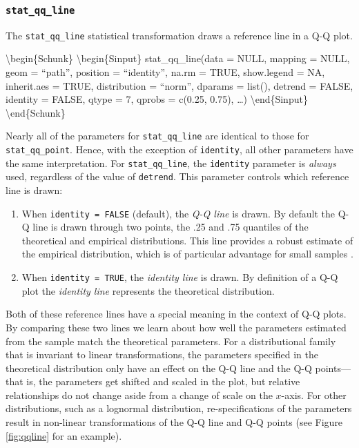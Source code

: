 \hypertarget{stat_qq_line}{%
\subsubsection{\texorpdfstring{\texttt{stat\_qq\_line}}{stat\_qq\_line}}\label{stat_qq_line}}

The \texttt{stat\_qq\_line} statistical transformation draws a reference
line in a Q-Q plot.

\textbackslash{}begin\{Schunk\} \textbackslash{}begin\{Sinput\}
stat\_qq\_line(data = NULL, mapping = NULL, geom = ``path'', position =
``identity'', na.rm = TRUE, show.legend = NA, inherit.aes = TRUE,
distribution = ``norm'', dparams = list(), detrend = FALSE, identity =
FALSE, qtype = 7, qprobs = c(0.25, 0.75), \ldots{})
\textbackslash{}end\{Sinput\} \textbackslash{}end\{Schunk\}

Nearly all of the parameters for \texttt{stat\_qq\_line} are identical
to those for \texttt{stat\_qq\_point}. Hence, with the exception of
\texttt{identity}, all other parameters have the same interpretation.
For \texttt{stat\_qq\_line}, the \texttt{identity} parameter is
\emph{always} used, regardless of the value of \texttt{detrend}. This
parameter controls which reference line is drawn:

\begin{enumerate}
\def\labelenumi{\alph{enumi})}
\tightlist
\item
  When \texttt{identity\ =\ FALSE} (default), the \emph{Q-Q line} is
  drawn. By default the Q-Q line is drawn through two points, the .25
  and .75 quantiles of the theoretical and empirical distributions. This
  line provides a robust estimate of the empirical distribution, which
  is of particular advantage for small samples \citep{Loy2016-fg}.
\item
  When \texttt{identity\ =\ TRUE}, the \emph{identity line} is drawn. By
  definition of a Q-Q plot the \emph{identity line} represents the
  theoretical distribution.
\end{enumerate}

Both of these reference lines have a special meaning in the context of
Q-Q plots. By comparing these two lines we learn about how well the
parameters estimated from the sample match the theoretical parameters.
For a distributional family that is invariant to linear transformations,
the parameters specified in the theoretical distribution only have an
effect on the Q-Q line and the Q-Q points---that is, the parameters get
shifted and scaled in the plot, but relative relationships do not change
aside from a change of scale on the \(x\)-axis. For other distributions,
such as a lognormal distribution, re-specifications of the parameters
result in non-linear transformations of the Q-Q line and Q-Q points (see
Figure \ref{fig:qqline} for an example).

